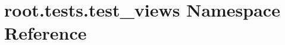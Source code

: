 \hypertarget{namespaceroot_1_1tests_1_1test__views}{\section{root.\-tests.\-test\-\_\-views Namespace Reference}
\label{namespaceroot_1_1tests_1_1test__views}
}

